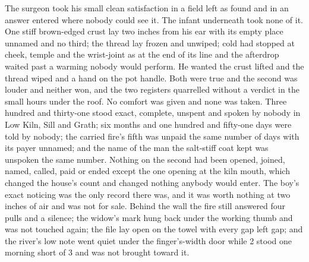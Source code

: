 The surgeon took his small clean satisfaction in a field left as found and in an answer entered where nobody could see it. The infant underneath took none of it. One stiff brown-edged crust lay two inches from his ear with its empty place unnamed and no third; the thread lay frozen and unwiped; cold had stopped at cheek, temple and the wrist-joint as at the end of its line and the afterdrop waited past a warming nobody would perform. He wanted the crust lifted and the thread wiped and a hand on the pot handle. Both were true and the second was louder and neither won, and the two registers quarrelled without a verdict in the small hours under the roof. No comfort was given and none was taken. Three hundred and thirty-one stood exact, complete, unspent and spoken by nobody in Low Kiln, Sill and Grath; six months and one hundred and fifty-one days were told by nobody; the carried fire's fifth was unpaid the same number of days with its payer unnamed; and the name of the man the salt-stiff coat kept was unspoken the same number. Nothing on the second had been opened, joined, named, called, paid or ended except the one opening at the kiln mouth, which changed the house's count and changed nothing anybody would enter. The boy's exact noticing was the only record there was, and it was worth nothing at two inches of air and was not for sale. Behind the wall the fire still answered four pulls and a silence; the widow's mark hung back under the working thumb and was not touched again; the file lay open on the towel with every gap left gap; and the river's low note went quiet under the finger's-width door while  2 stood one morning short of  3 and was not brought toward it.
